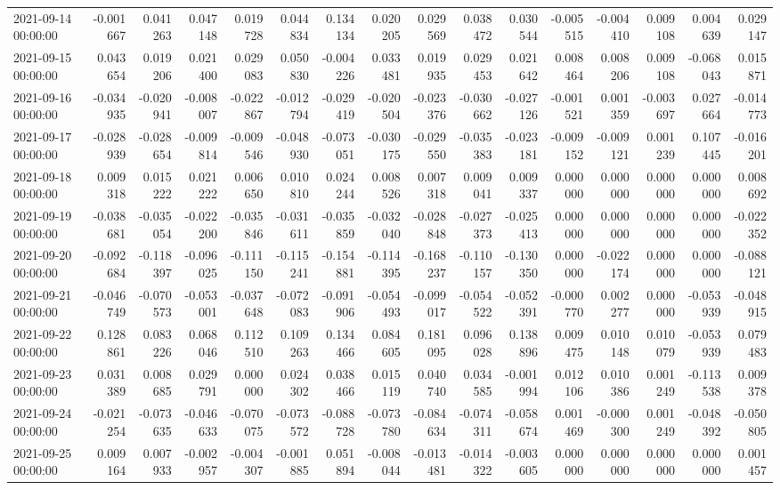 \begin{tabular}{lrrrrrrrrrrrrrrr}
2021-09-14 00:00:00 & -0.001667 & 0.041263 & 0.047148 & 0.019728 & 0.044834 & 0.134134 & 0.020205 & 0.029569 & 0.038472 & 0.030544 & -0.005515 & -0.004410 & 0.009108 & 0.004639 & 0.029147 \\
2021-09-15 00:00:00 & 0.043654 & 0.019206 & 0.021400 & 0.029083 & 0.050830 & -0.004226 & 0.033481 & 0.019935 & 0.029453 & 0.021642 & 0.008464 & 0.008206 & 0.009108 & -0.068043 & 0.015871 \\
2021-09-16 00:00:00 & -0.034935 & -0.020941 & -0.008007 & -0.022867 & -0.012794 & -0.029419 & -0.020504 & -0.023376 & -0.030662 & -0.027126 & -0.001521 & 0.001359 & -0.003697 & 0.027664 & -0.014773 \\
2021-09-17 00:00:00 & -0.028939 & -0.028654 & -0.009814 & -0.009546 & -0.048930 & -0.073051 & -0.030175 & -0.029550 & -0.035383 & -0.023181 & -0.009152 & -0.009121 & 0.001239 & 0.107445 & -0.016201 \\
2021-09-18 00:00:00 & 0.009318 & 0.015222 & 0.021222 & 0.006650 & 0.010810 & 0.024244 & 0.008526 & 0.007318 & 0.009041 & 0.009337 & 0.000000 & 0.000000 & 0.000000 & 0.000000 & 0.008692 \\
2021-09-19 00:00:00 & -0.038681 & -0.035054 & -0.022200 & -0.035846 & -0.031611 & -0.035859 & -0.032040 & -0.028848 & -0.027373 & -0.025413 & 0.000000 & 0.000000 & 0.000000 & 0.000000 & -0.022352 \\
2021-09-20 00:00:00 & -0.092684 & -0.118397 & -0.096025 & -0.111150 & -0.115241 & -0.154881 & -0.114395 & -0.168237 & -0.110157 & -0.130350 & 0.000000 & -0.022174 & 0.000000 & 0.000000 & -0.088121 \\
2021-09-21 00:00:00 & -0.046749 & -0.070573 & -0.053001 & -0.037648 & -0.072083 & -0.091906 & -0.054493 & -0.099017 & -0.054522 & -0.052391 & -0.000770 & 0.002277 & 0.000000 & -0.053939 & -0.048915 \\
2021-09-22 00:00:00 & 0.128861 & 0.083226 & 0.068046 & 0.112510 & 0.109263 & 0.134466 & 0.084605 & 0.181095 & 0.096028 & 0.138896 & 0.009475 & 0.010148 & 0.010079 & -0.053939 & 0.079483 \\
2021-09-23 00:00:00 & 0.031389 & 0.008685 & 0.029791 & 0.000000 & 0.024302 & 0.038466 & 0.015119 & 0.040740 & 0.034585 & -0.001994 & 0.012106 & 0.010386 & 0.001249 & -0.113538 & 0.009378 \\
2021-09-24 00:00:00 & -0.021254 & -0.073635 & -0.046633 & -0.070075 & -0.073572 & -0.088728 & -0.073780 & -0.084634 & -0.074311 & -0.058674 & 0.001469 & -0.000300 & 0.001249 & -0.048392 & -0.050805 \\
2021-09-25 00:00:00 & 0.009164 & 0.007933 & -0.002957 & -0.004307 & -0.001885 & 0.051894 & -0.008044 & -0.013481 & -0.014322 & -0.003605 & 0.000000 & 0.000000 & 0.000000 & 0.000000 & 0.001457 \\

\end{tabular}
